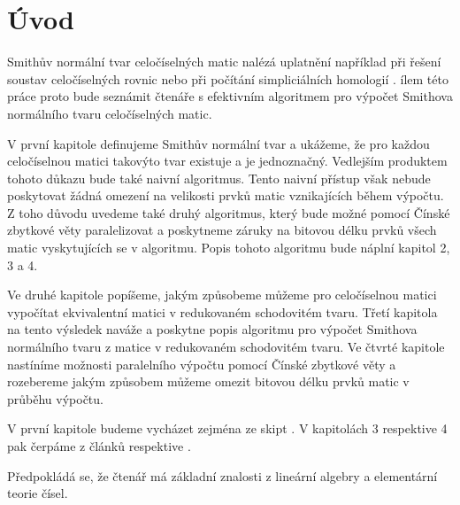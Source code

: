 \chapter*{Úvod}

Smithův normální tvar celočíselných matic nalézá uplatnění například při řešení
soustav celočíselných rovnic nebo při počítání simpliciálních homologií \cite{Simplic_Homo}.
ílem této práce proto bude seznámit čtenáře s efektivním
algoritmem pro výpočet Smithova normálního tvaru celočíselných matic.

V první kapitole definujeme Smithův normální tvar a ukážeme, že pro každou
celočíselnou matici takovýto tvar existuje a je jednoznačný. Vedlejším produktem
tohoto důkazu bude také naivní algoritmus.
Tento naivní přístup však nebude poskytovat žádná omezení na velikosti prvků
matic vznikajících během výpočtu. Z toho důvodu uvedeme také druhý algoritmus, který
bude možné pomocí Čínské zbytkové věty paralelizovat a poskytneme záruky na
bitovou délku prvků všech matic vyskytujících se v algoritmu.
Popis tohoto algoritmu bude náplní kapitol 2, 3 a 4.

Ve druhé kapitole popíšeme, jakým způsobeme můžeme pro celočíselnou matici
vypočítat ekvivalentní matici v redukovaném schodovitém tvaru. Třetí kapitola
na tento výsledek naváže a poskytne popis algoritmu pro výpočet Smithova
normálního tvaru z matice v redukovaném schodovitém tvaru. Ve čtvrté kapitole
nastíníme možnosti paralelního výpočtu pomocí Čínské zbytkové věty a rozebereme
jakým způsobem můžeme omezit bitovou délku prvků matic v průběhu výpočtu.

V první kapitole budeme vycházet zejména ze skipt \cite{vokr}. V kapitolách
3 respektive 4 pak čerpáme z článků \cite{triang} respektive \cite{SNF_Arne}.

Předpokládá se, že čtenář má základní znalosti z lineární algebry a
elementární teorie čísel.

\cleardoublepage

